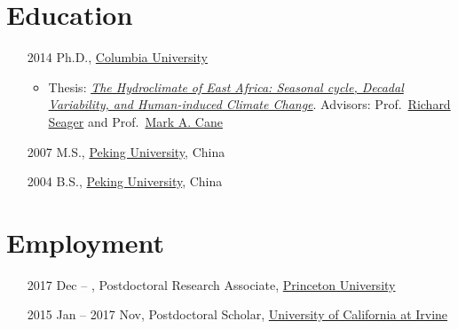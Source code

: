 \documentclass[11pt]{article}
\newcommand{\pu}{\href{https://www.princeton.edu}{Princeton University}}
\newcommand{\uci}{\href{http://www.uci.edu}{University of California at Irvine}}
\newcommand{\cu}{\href{http://www.columbia.edu}{Columbia University}}
\newcommand{\pku}{\href{http://english.pku.edu.cn}{Peking University}}
\newcommand{\benkui}{\href{http://www.phy.pku.edu.cn/personnel/das/bktan.xml}{Benkui Tan}}
\newcommand{\richard}{\href{http://www.ldeo.columbia.edu/res/div/ocp/people/seager/}{Richard Seager}}
\newcommand{\cane}{\href{http://www.ldeo.columbia.edu/user/mcane}{Mark A. Cane}}
\newcommand{\brad}{\href{http://climatechange.umaine.edu/people/profile/bradfield_lyon}
{Bradfield Lyon}}
\newcommand{\gudrun}{\href{http://sites.uci.edu/magnusdottir}{Gudrun Magnusdottir}}
\newcommand{\phdThesis}{\href{https://academiccommons.columbia.edu/catalog/ac:181305}{\textit{The Hydroclimate of East Africa: Seasonal cycle, Decadal Variability, and Human-induced Climate Change}}}
\begin{document}
\section{Education}
\begin{itemize}[leftmargin=10ex]
	\item[2014] Ph.D., \cu{}
	\begin{itemize}[leftmargin=0ex,label={},noitemsep,nolistsep]
		\item Thesis: \phdThesis{}.  
		Advisors: Prof.~\richard{} and Prof.~\cane{}
		\end{itemize}
	\item[2007] M.S., \pku{}, China %
	\item[2004] B.S., \pku{}, China
	\end{itemize}
	
\section{Employment}
\begin{itemize}[leftmargin=10ex, itemsep=0ex]
	\item[2017]Dec -- , Postdoctoral Research Associate, \pu{}
	\item[2015]Jan -- 2017 Nov, Postdoctoral Scholar, \uci{}
	\end{itemize}
\end{document}
